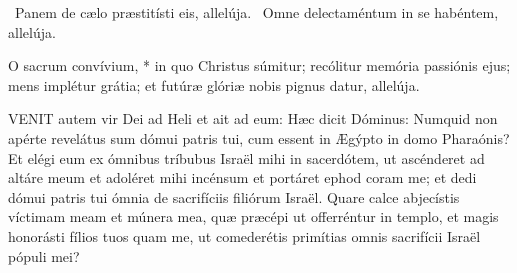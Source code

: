 
\V\ Panem de cælo præstitísti eis, allelúja. \R\ Omne delectaméntum in se habéntem, allelúja.

 O sacrum convívium, * in quo Christus súmitur; recólitur memória passiónis ejus; mens implétur grátia; et futúræ glóriæ nobis pignus datur, allelúja.








\lettrine[lines=2]{V}{ENIT} autem vir Dei ad Heli et ait ad eum: Hæc dicit Dóminus: Numquid non apérte revelátus sum dómui patris tui, cum essent in Ægýpto in domo Pharaónis? Et elégi eum ex ómnibus tríbubus Israël mihi in sacerdótem, ut ascénderet ad altáre meum et adoléret mihi incénsum et portáret ephod coram me; et dedi dómui patris tui ómnia de sacrifíciis filiórum Israël. Quare calce abjecístis víctimam meam et múnera mea, quæ præcépi ut offerréntur in templo, et magis honorásti fílios tuos quam me, ut comederétis primítias omnis sacrifícii Israël pópuli mei?


